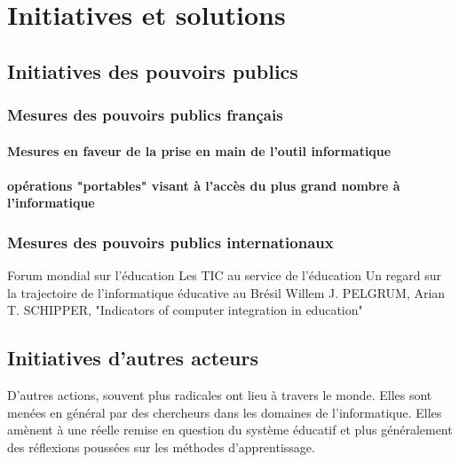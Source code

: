 
\chapter{Initiatives et solutions}\label{initiatives_actuelles}

\section{Initiatives des pouvoirs publics}

\subsection{Mesures des pouvoirs publics français}
\subsubsection{Mesures en faveur de la prise en main de l'outil informatique}
\cite{b2i_c2i}
\cite{b2i}
\cite{isn}

\subsubsection{opérations "portables" visant à l'accès du plus grand nombre à l'informatique}
\cite{portables35}
\cite{portables60}
\cite{portables40}

    


\subsection{Mesures des pouvoirs publics internationaux}
Forum mondial sur l’éducation \cite{educ_forum}
Les TIC au service de l’éducation \cite{tics}
Un regard sur la trajectoire de l’informatique éducative au Brésil \cite{peixoto2006regard}
Willem J. PELGRUM, Arian T. SCHIPPER, "Indicators of computer integration in education" \cite{pelgrum1993indicators}



\section{Initiatives d'autres acteurs}

D'autres actions, souvent plus radicales ont lieu à travers le monde. Elles sont menées en général par des chercheurs dans les domaines de l'informatique. Elles amènent à une réelle remise en question du système éducatif et plus généralement des réflexions poussées sur les méthodes d'apprentissage.

